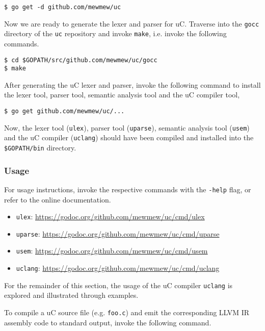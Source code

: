\begin{verbatim}
$ go get -d github.com/mewmew/uc
\end{verbatim}

Now we are ready to generate the lexer and parser for uC. Traverse into the \texttt{gocc} directory of the \texttt{uc} repository and invoke \texttt{make}, i.e. invoke the following commands.

\begin{verbatim}
$ cd $GOPATH/src/github.com/mewmew/uc/gocc
$ make
\end{verbatim}

After generating the uC lexer and parser, invoke the following command to install the lexer tool, parser tool, semantic analysis tool and the uC compiler tool,

\begin{verbatim}
$ go get github.com/mewmew/uc/...
\end{verbatim}

Now, the lexer tool (\texttt{ulex}), parser tool (\texttt{uparse}), semantic analysis tool (\texttt{usem}) and the uC compiler (\texttt{uclang}) should have been compiled and installed into the \verb+$GOPATH/bin+ directory.

\subsubsection{Usage}

For usage instructions, invoke the respective commands with the \verb+-help+ flag, or refer to the online documentation.

\begin{itemize}
	\item \texttt{ulex}: \url{https://godoc.org/github.com/mewmew/uc/cmd/ulex}
	\item \texttt{uparse}: \url{https://godoc.org/github.com/mewmew/uc/cmd/uparse}
	\item \texttt{usem}: \url{https://godoc.org/github.com/mewmew/uc/cmd/usem}
	\item \texttt{uclang}: \url{https://godoc.org/github.com/mewmew/uc/cmd/uclang}
\end{itemize}

For the remainder of this section, the usage of the uC compiler \texttt{uclang} is explored and illustrated through examples.

To compile a uC source file (e.g. \texttt{foo.c}) and emit the corresponding LLVM IR assembly code to standard output, invoke the following command.

